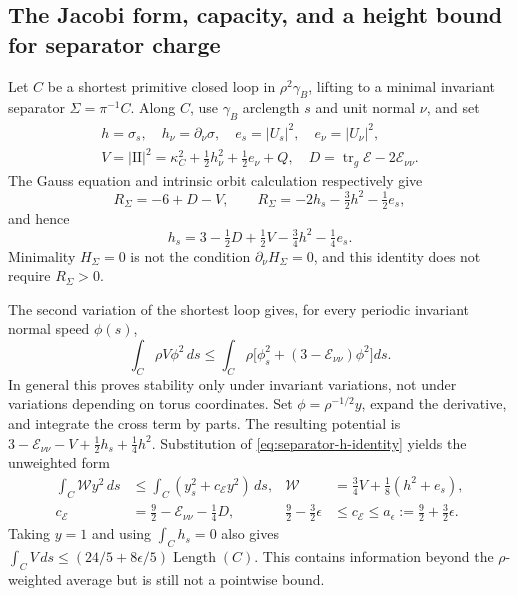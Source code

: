 \documentclass[a4paper,11pt]{article}
\numberwithin{equation}{section}
\theoremstyle{definition}
\newcommand{\tr}{\operatorname{tr}}
\begin{document}
\subsection{The Jacobi form, capacity, and a height bound for separator charge}
Let $C$ be a shortest primitive closed loop in $\rho^2\gamma_B$, lifting to a minimal invariant separator $\Sigma=\pi^{-1}C$.
Along $C$, use $\gamma_B$ arclength $s$ and unit normal $\nu$, and set
\[
 \begin{gathered}
 h=\sigma_s,\quad h_\nu=\partial_\nu\sigma,\quad
 e_s=|U_s|^2,\quad e_\nu=|U_\nu|^2,\\
 V=|\mathrm{II}|^2=\kappa_C^2+\tfrac12h_\nu^2+\tfrac12e_\nu+Q,
 \quad D=\tr_g\mathcal E-2\mathcal E_{\nu\nu}.
 \end{gathered}
\]
The Gauss equation and intrinsic orbit calculation respectively give
\[
 R_\Sigma=-6+D-V,
 \qquad R_\Sigma=-2h_s-\tfrac32h^2-\tfrac12e_s,
\]
and hence
\begin{equation}\label{eq:separator-h-identity}
 h_s=3-\tfrac12D+\tfrac12V-\tfrac34h^2-\tfrac14e_s.
\end{equation}
Minimality $H_\Sigma=0$ is not the condition $\partial_\nu H_\Sigma=0$, and this identity does not require $R_\Sigma>0$.

The second variation of the shortest loop gives, for every periodic invariant normal speed $\phi(s)$,
\begin{equation}\label{eq:separator-jacobi}
 \int_C\rho V\phi^2\,ds\le
 \int_C\rho\bigl[\phi_s^2+(3-\mathcal E_{\nu\nu})\phi^2\bigr]ds.
\end{equation}
In general this proves stability only under invariant variations, not under variations depending on torus coordinates.
Set $\phi=\rho^{-1/2}y$, expand the derivative, and integrate the cross term by parts.
The resulting potential is
$3-\mathcal E_{\nu\nu}-V+\frac12h_s+\frac14h^2$.
Substitution of \eqref{eq:separator-h-identity} yields the unweighted form
\begin{align}
 \int_C\mathcal W y^2\,ds
 &\le\int_C(y_s^2+c_{\mathcal E}y^2)\,ds,
 &\mathcal W&=\tfrac34V+\tfrac18(h^2+e_s),\label{eq:separator-schrodinger}\\
 c_{\mathcal E}&=\tfrac92-\mathcal E_{\nu\nu}-\tfrac14D,
 &\tfrac92-\tfrac32\epsilon&\le c_{\mathcal E}\le a_\epsilon:=\tfrac92+\tfrac32\epsilon.
\end{align}
Taking $y=1$ and using $\int_C h_s=0$ also gives
$\int_CV\,ds\le(24/5+8\epsilon/5)\operatorname{Length}(C)$.
This contains information beyond the $\rho$-weighted average but is still not a pointwise bound.
\end{document}
